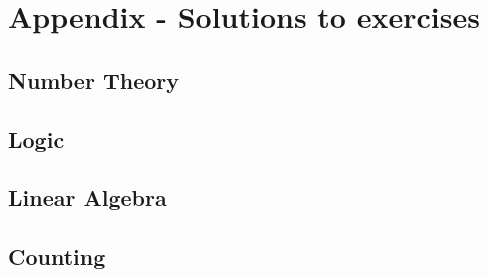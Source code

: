 \documentclass{article}
\theoremstyle{plain}
\numberwithin{theorem}{subsection}
\begin{document}
\section{Appendix - Solutions to exercises}

\subsection*{Number Theory}
\setcounter{section}{2}





\subsection*{Logic}
\setcounter{section}{3}
\setcounter{Q}{0}






\subsection*{Linear Algebra}
\setcounter{section}{4}
\setcounter{Q}{0}





\subsection*{Counting}
\setcounter{section}{5}
\setcounter{Q}{0}


%


  
\end{document}
